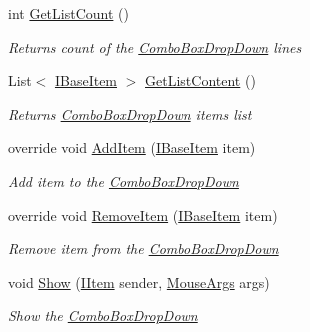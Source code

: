 \begin{DoxyCompactItemize}
int \mbox{\hyperlink{class_space_v_i_l_1_1_combo_box_drop_down_a645a040cf0880708d4fbc86e5392ad94}{Get\+List\+Count}} ()
\begin{DoxyCompactList}\small\item\em Returns count of the \mbox{\hyperlink{class_space_v_i_l_1_1_combo_box_drop_down}{Combo\+Box\+Drop\+Down}} lines \end{DoxyCompactList}\item 
List$<$ \mbox{\hyperlink{interface_space_v_i_l_1_1_core_1_1_i_base_item}{I\+Base\+Item}} $>$ \mbox{\hyperlink{class_space_v_i_l_1_1_combo_box_drop_down_a44d05f922b3320c8f4ed7563656dfe56}{Get\+List\+Content}} ()
\begin{DoxyCompactList}\small\item\em Returns \mbox{\hyperlink{class_space_v_i_l_1_1_combo_box_drop_down}{Combo\+Box\+Drop\+Down}} items list \end{DoxyCompactList}\item 
override void \mbox{\hyperlink{class_space_v_i_l_1_1_combo_box_drop_down_aaaaf954c53c9e0adba384e25b66150a1}{Add\+Item}} (\mbox{\hyperlink{interface_space_v_i_l_1_1_core_1_1_i_base_item}{I\+Base\+Item}} item)
\begin{DoxyCompactList}\small\item\em Add item to the \mbox{\hyperlink{class_space_v_i_l_1_1_combo_box_drop_down}{Combo\+Box\+Drop\+Down}} \end{DoxyCompactList}\item 
override void \mbox{\hyperlink{class_space_v_i_l_1_1_combo_box_drop_down_a78a089740c66f8d4cf151da273eafd73}{Remove\+Item}} (\mbox{\hyperlink{interface_space_v_i_l_1_1_core_1_1_i_base_item}{I\+Base\+Item}} item)
\begin{DoxyCompactList}\small\item\em Remove item from the \mbox{\hyperlink{class_space_v_i_l_1_1_combo_box_drop_down}{Combo\+Box\+Drop\+Down}} \end{DoxyCompactList}\item 
void \mbox{\hyperlink{class_space_v_i_l_1_1_combo_box_drop_down_a03c88461af5f952883e306c1e5da555b}{Show}} (\mbox{\hyperlink{interface_space_v_i_l_1_1_core_1_1_i_item}{I\+Item}} sender, \mbox{\hyperlink{class_space_v_i_l_1_1_core_1_1_mouse_args}{Mouse\+Args}} args)
\begin{DoxyCompactList}\small\item\em Show the \mbox{\hyperlink{class_space_v_i_l_1_1_combo_box_drop_down}{Combo\+Box\+Drop\+Down}} \end{DoxyCompactList}\item 

\end{DoxyCompactItemize}
